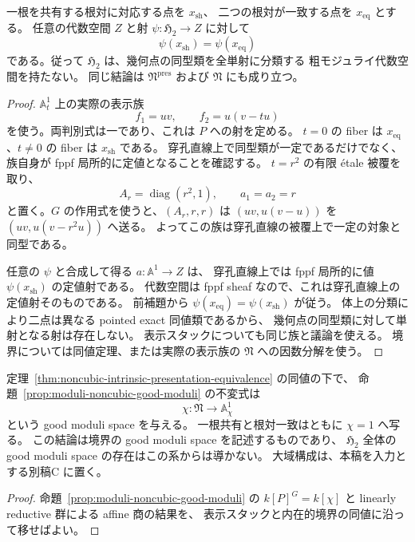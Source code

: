 \begin{corollary}
\label{cor:global-h2-no-coarse-space}
一根を共有する根対に対応する点を $x_{\mathrm{sh}}$、
二つの根対が一致する点を $x_{\mathrm{eq}}$ とする。
任意の代数空間 $Z$ と射 $\psi:\mathfrak H_2\to Z$ に対して
\[
 \psi(x_{\mathrm{sh}})=\psi(x_{\mathrm{eq}})
\]
である。従って $\mathfrak H_2$ は、幾何点の同型類を全単射に分類する
粗モジュライ代数空間を持たない。
同じ結論は $\mathfrak N^{\mathrm{pres}}$ および $\mathfrak N$ にも成り立つ。
\end{corollary}
\begin{proof}
$\mathbb A^1_t$ 上の実際の表示族
\[
 f_1=uv,\qquad f_2=u(v-tu)
\]
を使う。両判別式は一であり、これは $P$ への射を定める。
$t=0$ の fiber は $x_{\mathrm{eq}}$、$t\ne0$ の fiber は $x_{\mathrm{sh}}$ である。
穿孔直線上で同型類が一定であるだけでなく、族自身が fppf 局所的に定値となることを確認する。
$t=r^2$ の有限 \texorpdfstring{\'etale}{etale} 被覆を取り、
\[
 A_r=\operatorname{diag}(r^2,1),\qquad a_1=a_2=r
\]
と置く。$G$ の作用式を使うと、$(A_r,r,r)$ は
$(uv,u(v-u))$ を $(uv,u(v-r^2u))$ へ送る。
よってこの族は穿孔直線の被覆上で一定の対象と同型である。

任意の $\psi$ と合成して得る $a:\mathbb A^1\to Z$ は、
穿孔直線上では fppf 局所的に値 $\psi(x_{\mathrm{sh}})$ の定値射である。
代数空間は fppf sheaf なので、これは穿孔直線上の定値射そのものである。
前補題から $\psi(x_{\mathrm{eq}})=\psi(x_{\mathrm{sh}})$ が従う。
体上の分類により二点は異なる pointed exact 同値類であるから、
幾何点の同型類に対して単射となる射は存在しない。
表示スタックについても同じ族と議論を使える。
境界については同値定理、または実際の表示族の $\mathfrak N$ への因数分解を使う。
\end{proof}

\begin{corollary}[内在的境界の良モジュライ空間]
\label{cor:intrinsic-boundary-good-moduli}
定理~\ref{thm:noncubic-intrinsic-presentation-equivalence} の同値の下で、
命題~\ref{prop:moduli-noncubic-good-moduli} の不変式は
\[
 \chi:\mathfrak N\longrightarrow\mathbb A^1_\chi
\]
という good moduli space を与える。
一根共有と根対一致はともに $\chi=1$ へ写る。
この結論は境界の good moduli space を記述するものであり、
$\mathfrak H_2$ 全体の good moduli space の存在はこの系からは導かない。
大域構成は、本稿を入力とする別稿C
\cite[\texttt{thm:qa-global-h2-quasiprojective-good-moduli}]{QuiverAvatarModuli2026}に置く。
\end{corollary}
\begin{proof}
命題~\ref{prop:moduli-noncubic-good-moduli} の
$k[P]^G=k[\chi]$ と linearly reductive 群による affine 商の結果を、
表示スタックと内在的境界の同値に沿って移せばよい。
\end{proof}


